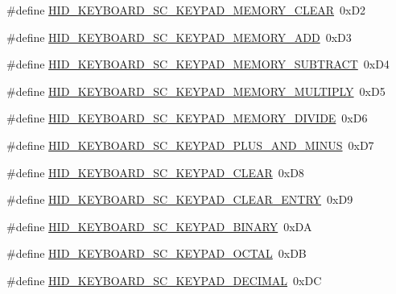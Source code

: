 \begin{DoxyCompactItemize}
\item 
\#define \hyperlink{group__Group__USBClassHIDCommon_gaf2a1c4fd5376d03fe9bbf4c8d8e0b777}{H\+I\+D\+\_\+\+K\+E\+Y\+B\+O\+A\+R\+D\+\_\+\+S\+C\+\_\+\+K\+E\+Y\+P\+A\+D\+\_\+\+M\+E\+M\+O\+R\+Y\+\_\+\+C\+L\+E\+AR}~0x\+D2
\item 
\#define \hyperlink{group__Group__USBClassHIDCommon_gab9a0804d84283f2919cf3587f541fe3d}{H\+I\+D\+\_\+\+K\+E\+Y\+B\+O\+A\+R\+D\+\_\+\+S\+C\+\_\+\+K\+E\+Y\+P\+A\+D\+\_\+\+M\+E\+M\+O\+R\+Y\+\_\+\+A\+DD}~0x\+D3
\item 
\#define \hyperlink{group__Group__USBClassHIDCommon_ga1360892faf3c7d24f280f9b7286d8789}{H\+I\+D\+\_\+\+K\+E\+Y\+B\+O\+A\+R\+D\+\_\+\+S\+C\+\_\+\+K\+E\+Y\+P\+A\+D\+\_\+\+M\+E\+M\+O\+R\+Y\+\_\+\+S\+U\+B\+T\+R\+A\+CT}~0x\+D4
\item 
\#define \hyperlink{group__Group__USBClassHIDCommon_ga7a17f1d325cd60b9f1840ee675093d5b}{H\+I\+D\+\_\+\+K\+E\+Y\+B\+O\+A\+R\+D\+\_\+\+S\+C\+\_\+\+K\+E\+Y\+P\+A\+D\+\_\+\+M\+E\+M\+O\+R\+Y\+\_\+\+M\+U\+L\+T\+I\+P\+LY}~0x\+D5
\item 
\#define \hyperlink{group__Group__USBClassHIDCommon_ga5924df585548f95fb958af3f3abbb7ee}{H\+I\+D\+\_\+\+K\+E\+Y\+B\+O\+A\+R\+D\+\_\+\+S\+C\+\_\+\+K\+E\+Y\+P\+A\+D\+\_\+\+M\+E\+M\+O\+R\+Y\+\_\+\+D\+I\+V\+I\+DE}~0x\+D6
\item 
\#define \hyperlink{group__Group__USBClassHIDCommon_ga6e92acbcb44ef6d44fcff2d0679d841a}{H\+I\+D\+\_\+\+K\+E\+Y\+B\+O\+A\+R\+D\+\_\+\+S\+C\+\_\+\+K\+E\+Y\+P\+A\+D\+\_\+\+P\+L\+U\+S\+\_\+\+A\+N\+D\+\_\+\+M\+I\+N\+US}~0x\+D7
\item 
\#define \hyperlink{group__Group__USBClassHIDCommon_gac8be7660dc5dc589248df7502736896f}{H\+I\+D\+\_\+\+K\+E\+Y\+B\+O\+A\+R\+D\+\_\+\+S\+C\+\_\+\+K\+E\+Y\+P\+A\+D\+\_\+\+C\+L\+E\+AR}~0x\+D8
\item 
\#define \hyperlink{group__Group__USBClassHIDCommon_ga5366711bda8ac5dc2149b2c033cefd8d}{H\+I\+D\+\_\+\+K\+E\+Y\+B\+O\+A\+R\+D\+\_\+\+S\+C\+\_\+\+K\+E\+Y\+P\+A\+D\+\_\+\+C\+L\+E\+A\+R\+\_\+\+E\+N\+T\+RY}~0x\+D9
\item 
\#define \hyperlink{group__Group__USBClassHIDCommon_ga2580c7202b7057a1da7df950760ad898}{H\+I\+D\+\_\+\+K\+E\+Y\+B\+O\+A\+R\+D\+\_\+\+S\+C\+\_\+\+K\+E\+Y\+P\+A\+D\+\_\+\+B\+I\+N\+A\+RY}~0x\+DA
\item 
\#define \hyperlink{group__Group__USBClassHIDCommon_gaee6b0378ac73e8c237d7dcc47343c52e}{H\+I\+D\+\_\+\+K\+E\+Y\+B\+O\+A\+R\+D\+\_\+\+S\+C\+\_\+\+K\+E\+Y\+P\+A\+D\+\_\+\+O\+C\+T\+AL}~0x\+DB
\item 
\#define \hyperlink{group__Group__USBClassHIDCommon_ga3bd12de97575c0f54624278a436d0d99}{H\+I\+D\+\_\+\+K\+E\+Y\+B\+O\+A\+R\+D\+\_\+\+S\+C\+\_\+\+K\+E\+Y\+P\+A\+D\+\_\+\+D\+E\+C\+I\+M\+AL}~0x\+DC

\end{DoxyCompactItemize}
